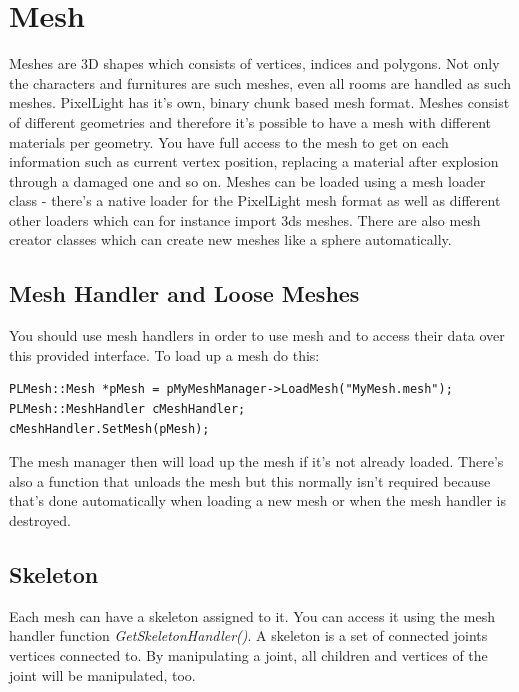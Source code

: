 \section{Mesh}
Meshes are 3D shapes which consists of vertices, indices and polygons. Not only the characters and furnitures are such meshes, even all rooms are handled as such meshes. PixelLight has it's own, binary chunk based mesh format. Meshes consist of different geometries and therefore it's possible to have a mesh with different materials per geometry. You have full access to the mesh to get on each information such as current vertex position, replacing a material after explosion through a damaged one and so on. Meshes can be loaded using a mesh loader class - there's a native loader for the PixelLight mesh format as well as different other loaders which can for instance import 3ds meshes. There are also mesh creator classes which can create new meshes like a sphere automatically.




\subsection{Mesh Handler and Loose Meshes}
You should use mesh handlers in order to use mesh and to access their data over this provided interface. To load up a mesh do this:

\begin{lstlisting}[caption=Loading a mesh]
PLMesh::Mesh *pMesh = pMyMeshManager->LoadMesh("MyMesh.mesh");
PLMesh::MeshHandler cMeshHandler;
cMeshHandler.SetMesh(pMesh);
\end{lstlisting}

The mesh manager then will load up the mesh if it's not already loaded. There's also a function that unloads the mesh but this normally isn't required because that's done automatically when loading a new mesh or when the mesh handler is destroyed.




\subsection{Skeleton}
Each mesh can have a skeleton assigned to it. You can access it using the mesh handler function \emph{GetSkeletonHandler()}. A skeleton is a set of connected joints vertices connected to. By manipulating a joint, all children and vertices of the joint will be manipulated, too.

